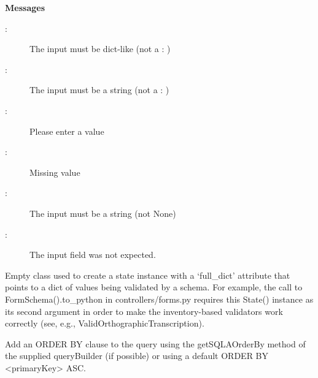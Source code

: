 \documentclass[letterpaper,10pt,english]{sphinxmanual}
\begin{document}

\begin{fulllineitems}
\label{api:old.lib.utils.PaginatorSchema}
\textbf{Messages}
\begin{description}
\item[{:}] \leavevmode
The input must be dict-like (not a : )

\item[{:}] \leavevmode
The input must be a string (not a : )

\item[{:}] \leavevmode
Please enter a value

\item[{:}] \leavevmode
Missing value

\item[{:}] \leavevmode
The input must be a string (not None)

\item[{:}] \leavevmode
The input field  was not expected.

\end{description}

\end{fulllineitems}


\begin{fulllineitems}
\label{api:old.lib.utils.State}
Empty class used to create a state instance with a `full\_dict' attribute
that points to a dict of values being validated by a schema.  For example,
the call to FormSchema().to\_python in controllers/forms.py requires this
State() instance as its second argument in order to make the inventory-based
validators work correctly (see, e.g., ValidOrthographicTranscription).

\end{fulllineitems}


\begin{fulllineitems}
\label{api:old.lib.utils.addOrderBy}
Add an ORDER BY clause to the query using the getSQLAOrderBy method of
the supplied queryBuilder (if possible) or using a default ORDER BY \textless{}primaryKey\textgreater{} ASC.

\end{fulllineitems}
\end{document}
